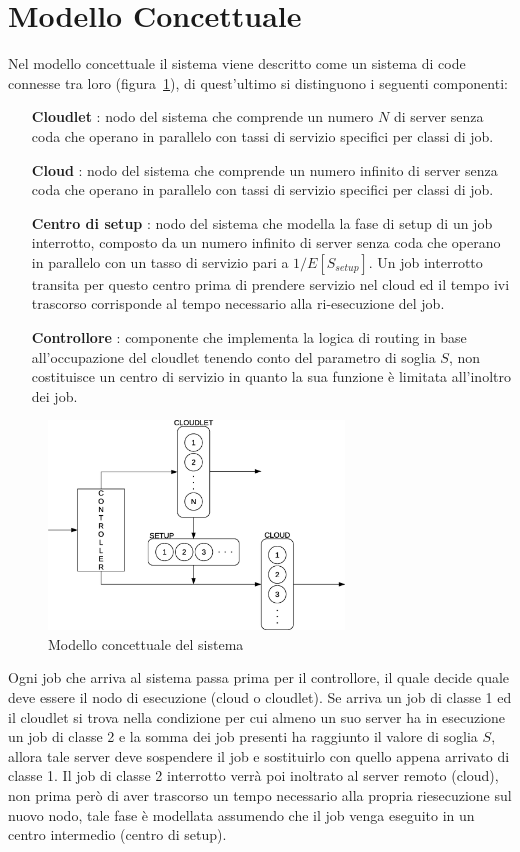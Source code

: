 \section{Modello Concettuale}
Nel modello concettuale il sistema viene descritto come un sistema di code
connesse tra loro (figura~\ref{conceptual}), di quest'ultimo si distinguono i
seguenti componenti:
\begin{itemize}
\item[\textbf{Cloudlet}]: nodo del sistema che comprende un numero $N$ di server
senza coda che operano in parallelo con tassi di servizio specifici per classi
di job.
\item[\textbf{Cloud}]: nodo del sistema che comprende un numero infinito di
server senza coda che operano in parallelo con tassi di servizio specifici per
classi di job.
\item[\textbf{Centro di setup}]: nodo del sistema che modella la fase di setup
di un job interrotto, composto da un numero infinito di server senza coda che
operano in parallelo con un tasso di servizio pari a $1/E[S_{setup}]$. Un job
interrotto transita per questo centro prima di prendere servizio nel cloud ed il
tempo ivi trascorso corrisponde al tempo necessario alla ri-esecuzione del job.
\item[\textbf{Controllore}]: componente che implementa la logica di routing in
base all’occupazione del cloudlet tenendo conto del parametro di soglia $S$, non
costituisce un centro di servizio in quanto la sua funzione è limitata
all'inoltro dei job.
\end{itemize} 
%
\begin{figure}[!h]
\centering
\includegraphics[width=0.7\textwidth]{figures/conceptual}
\caption{Modello concettuale del sistema}
\label{conceptual}
\end{figure}
%
Ogni job che arriva al sistema passa prima per il controllore, il quale decide
quale deve essere il nodo di esecuzione (cloud o cloudlet). Se arriva un job di
classe 1 ed il cloudlet si trova nella condizione per cui almeno un suo server
ha in esecuzione un job di classe 2 e la somma dei job presenti ha raggiunto il
valore di soglia $S$, allora tale server deve sospendere il job e sostituirlo con
quello appena arrivato di classe 1. Il job di classe 2 interrotto verrà poi
inoltrato al server remoto (cloud), non prima però di aver trascorso un tempo
necessario alla propria riesecuzione sul nuovo nodo, tale fase è modellata
assumendo che il job venga eseguito in un centro intermedio (centro di setup).
